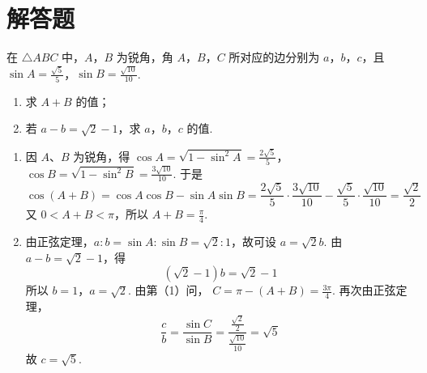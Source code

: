 \section{解答题}

\begin{problem}
在 \(\triangle ABC\) 中，\(A\)，\(B\) 为锐角，角 \(A\)，\(B\)，\(C\) 所对应的边分别为 \(a\)，\(b\)，\(c\)，且 \(\sin A = \frac{\sqrt{5}}{5}\)，\(\sin B = \frac{\sqrt{10}}{10}\).

\begin{enumerate}
\item 求 \(A + B\) 的值；
\item 若 \(a - b = \sqrt{2} - 1\)，求 \(a\)，\(b\)，\(c\) 的值.
\end{enumerate}
\begin{solution}
\begin{enumerate}
\item 因 \(A\)、\(B\) 为锐角，得
\(\cos A=\sqrt{1-\sin^2A}=\frac{2\sqrt5}{5}\)，\(\cos B=\sqrt{1-\sin^2B}=\frac{3\sqrt{10}}{10}\).
于是
\[
\cos(A+B)=\cos A\cos B-\sin A\sin B
=\frac{2\sqrt5}{5}\cdot\frac{3\sqrt{10}}{10}
-\frac{\sqrt5}{5}\cdot\frac{\sqrt{10}}{10}
=\frac{\sqrt2}{2}
\]
又 \(0<A+B<\pi\)，所以 \(A+B=\frac{\pi}{4}\).

\item 由正弦定理，\(a:b=\sin A:\sin B=\sqrt2:1\)，故可设 \(a=\sqrt2 b\). 由
\(a-b=\sqrt2-1\)，得
\[
(\sqrt2-1)b=\sqrt2-1
\]
所以 \(b=1\)，\(a=\sqrt2\). 由第（1）问，
\(C=\pi-(A+B)=\frac{3\pi}{4}\). 再次由正弦定理，
\[
\frac{c}{b}=\frac{\sin C}{\sin B}
=\frac{\frac{\sqrt2}{2}}{\frac{\sqrt{10}}{10}}=\sqrt5
\]
故 \(c=\sqrt5\).
\end{enumerate}
\end{solution}
\end{problem}

